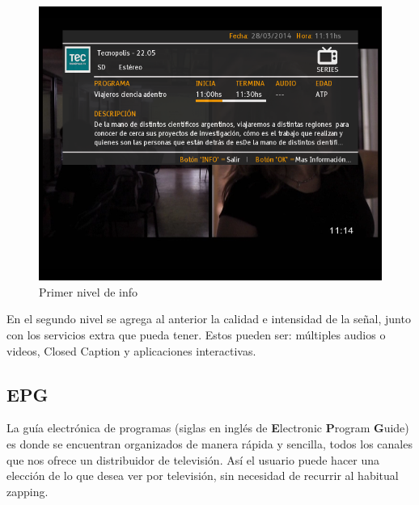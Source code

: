 \documentclass{article}
\begin{document}
	\begin{figure}[h]
 		\centerline{\includegraphics[scale=0.5,keepaspectratio=true]{info1}}
		\caption{Primer nivel de info}
	\end{figure}
	
En el segundo nivel se agrega al anterior la calidad e intensidad de la señal, junto con los servicios extra que pueda tener.
Estos pueden ser: múltiples audios o videos, Closed Caption y aplicaciones interactivas.

\subsection{EPG}
La guía electrónica de programas (siglas en inglés de \textbf{E}lectronic \textbf{P}rogram \textbf{G}uide) es donde se encuentran organizados de manera rápida y sencilla, todos los canales que nos ofrece un distribuidor de televisión. Así el usuario puede hacer una elección de lo que desea ver por televisión, sin necesidad de recurrir al habitual zapping.
\end{document}
